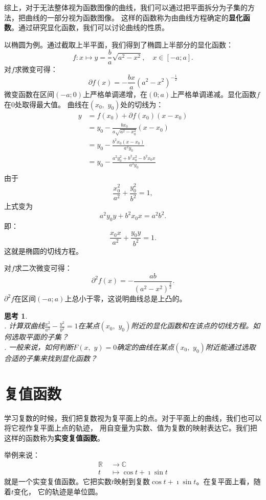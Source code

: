 \documentclass[12pt,UTF8]{ctexbook}
\theoremstyle{definition}
\theoremstyle{plain}
\newtheorem{sk}{思考}[section]
\begin{document}
综上，对于无法整体视为函数图像的曲线，我们可以通过把平面拆分为子集的方法，把曲线的一部分视为函数图像。
这样的函数称为由曲线方程确定的\textbf{显化函数}。通过研究显化函数，我们可以讨论曲线的性质。

以椭圆为例。通过截取上半平面，我们得到了椭圆上半部分的显化函数：
$$ f: x\mapsto y = \frac{b}{a}\sqrt{a^2 - x^2}, \quad x \in [-a; a].  $$
对$f$求微变可得：
$$ \partial f(x) = -\frac{bx}{a}(a^2 - x^2)^{-\frac{1}{2}}$$
微变函数在区间$(-a;0)$上严格单调递增，在$(0;a)$上严格单调递减。显化函数$f$在$0$处取得最大值。
曲线在$(x_0,\,\, y_0)$处的切线为：
\begin{align*}
    y &= f(x_0) + \partial f(x_0)(x - x_0) \\
    &= y_0 -\frac{bx_0}{a\sqrt{a^2 - x_0^2}}(x - x_0) \\
    &= y_0 - \frac{b^2x_0(x - x_0)}{a^2y_0} \\
    &= y_0 - \frac{a^2y_0^2 + b^2x_0^2 - b^2x_0x}{a^2y_0} \\
\end{align*}
由于
$$ \frac{x_0^2}{a^2} + \frac{y_0^2}{b^2} = 1,$$
上式变为
$$ a^2y_0y +  b^2x_0x = a^2b^2. $$
即：
$$ \frac{x_0x}{a^2} + \frac{y_0y}{b^2} = 1.$$
这就是椭圆的切线方程。

对$f$求二次微变可得：
$$ \partial^2 f(x) = -\frac{ab}{(a^2 - x^2)^{\frac{3}{2}} }.$$
$\partial^2 f$在区间$(-a;a)$上总小于零，这说明曲线总是上凸的。

\begin{sk}
    \mbox{} \\
    . 计算双曲线$\frac{x^2}{a^2} - \frac{y^2}{b^2} = 1$在某点$(x_0,\,\,y_0)$附近的显化函数和在该点的切线方程。如何选取平面的子集？\\
    . 一般来说，如何判断$F(x,\,\, y) = 0$确定的曲线在某点$(x_0,\,\,y_0)$附近能通过选取合适的子集来找到显化函数？
\end{sk}

\section{复值函数}

学习复数的时候，我们把复数视为复平面上的点。对于平面上的曲线，我们也可以将它视作复平面上点的轨迹，
用自变量为实数、值为复数的映射表达它。我们把这样的函数称为\textbf{实变复值函数}。

举例来说：
\begin{align*}
    \mathbb{R} \;&\rightarrow \mathbb{C} \\
    t \;&\mapsto \cos{t} + \imath \sin{t}
\end{align*}
就是一个实变复值函数。它把实数$t$映射到复数$\cos{t} + \imath \sin{t}$。在复平面上看，随着$t$变化，
它的轨迹是单位圆。
\end{document}
